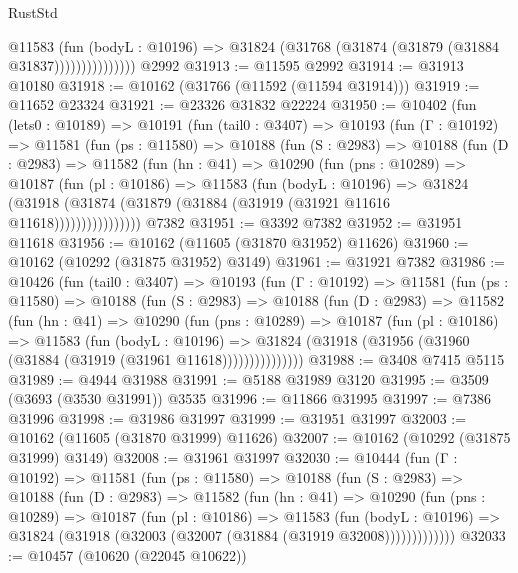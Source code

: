 \begin{lexlean}{RustStd}
\begin{coremodule}
                      @11583
                        (fun (bodyL : @10196) =>
                        @31824 (@31768 (@31874 (@31879 (@31884 @31837)))))))))))))))
    @2992
@31913 := @11595 @2992
@31914 := @31913 @10180
@31918 := @10162 (@31766 (@11592 (@11594 @31914)))
@31919 := @11652 @23324
@31921 := @23326 @31832 @22224
@31950 := @10402
    (fun (lets0 : @10189) =>
    @10191
      (fun (tail0 : @3407) =>
      @10193
        (fun (Γ : @10192) =>
        @11581
          (fun (ps : @11580) =>
          @10188
            (fun (S : @2983) =>
            @10188
              (fun (D : @2983) =>
              @11582
                (fun (hn : @41) =>
                @10290
                  (fun (pns : @10289) =>
                  @10187
                    (fun (pl : @10186) =>
                    @11583
                      (fun (bodyL : @10196) =>
                      @31824
                        (@31918
                          (@31874 (@31879 (@31884 (@31919 (@31921 @11616 @11618))))))))))))))))
    @7382
@31951 := @3392 @7382
@31952 := @31951 @11618
@31956 := @10162 (@11605 (@31870 @31952) @11626)
@31960 := @10162 (@10292 (@31875 @31952) @3149)
@31961 := @31921 @7382
@31986 := @10426
    (fun (tail0 : @3407) =>
    @10193
      (fun (Γ : @10192) =>
      @11581
        (fun (ps : @11580) =>
        @10188
          (fun (S : @2983) =>
          @10188
            (fun (D : @2983) =>
            @11582
              (fun (hn : @41) =>
              @10290
                (fun (pns : @10289) =>
                @10187
                  (fun (pl : @10186) =>
                  @11583
                    (fun (bodyL : @10196) =>
                    @31824 (@31918 (@31956 (@31960 (@31884 (@31919 (@31961 @11618)))))))))))))))
@31988 := @3408 @7415 @5115
@31989 := @4944 @31988
@31991 := @5188 @31989 @3120
@31995 := @3509 (@3693 (@3530 @31991)) @3535
@31996 := @11866 @31995
@31997 := @7386 @31996
@31998 := @31986 @31997
@31999 := @31951 @31997
@32003 := @10162 (@11605 (@31870 @31999) @11626)
@32007 := @10162 (@10292 (@31875 @31999) @3149)
@32008 := @31961 @31997
@32030 := @10444
    (fun (Γ : @10192) =>
    @11581
      (fun (ps : @11580) =>
      @10188
        (fun (S : @2983) =>
        @10188
          (fun (D : @2983) =>
          @11582
            (fun (hn : @41) =>
            @10290
              (fun (pns : @10289) =>
              @10187
                (fun (pl : @10186) =>
                @11583
                  (fun (bodyL : @10196) =>
                  @31824 (@31918 (@32003 (@32007 (@31884 (@31919 @32008)))))))))))))
@32033 := @10457 (@10620 (@22045 @10622))

\end{coremodule}
\end{lexlean}
